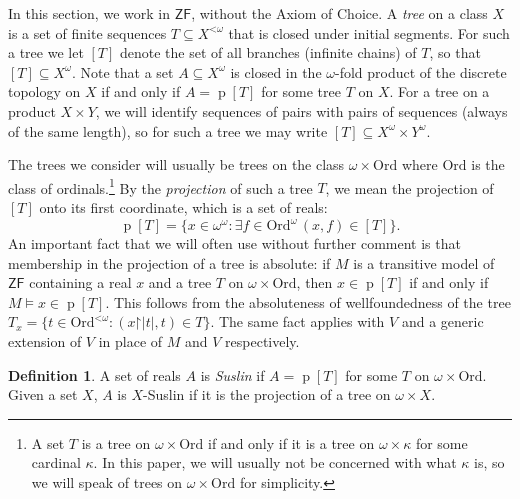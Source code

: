 \documentclass[fleqn, 11pt]{amsart}
\theoremstyle{plain}
\theoremstyle{definition}
\newtheorem{defn}[thm]{Definition} \newtheorem*{defn*}{Definition}
\theoremstyle{remark}
\newcommand{\Ord}{\mathrm{Ord}}
\newcommand{\restrict}{\mathord{\restriction}}
\DeclareMathOperator{\p}{p}
\begin{document}
In this section, we work in $\mathsf{ZF}$, without the Axiom of Choice. 
A \emph{tree} on a class $X$ is a set of finite sequences $T \subseteq X^{\mathord{<}\omega}$
that is closed under initial segments.
For such a tree we let $[T]$ denote the set of all branches (infinite chains) of $T$, so that $[T]\subseteq X^\omega$.
Note that a set $A \subseteq X^\omega$ is closed in the $\omega$-fold product of the discrete topology on $X$ if and only if $A = \p[T]$ for some tree $T$ on $X$.
For a tree on a product $X \times Y$, we will identify sequences of pairs with pairs of sequences (always of the same length),
so for such a tree we may write $[T] \subseteq X^\omega \times Y^\omega$.

The trees we consider will usually be trees on the class $\omega \times \Ord$ where $\Ord$ is the class of ordinals.\footnote{A set $T$ is a tree on $\omega \times \Ord$ if and only if it is a tree on $\omega \times \kappa$ for some cardinal $\kappa$.
In this paper, we will usually not be concerned with what $\kappa$ is, so we will speak of trees on $\omega \times \Ord$ for simplicity.}
By the \emph{projection} of such a tree $T$, we mean the projection of $[T]$ onto its first coordinate, which is a set of reals:
\[ \p[T] = \{x \in \omega^\omega : \exists f \in \Ord^\omega\, (x,f) \in [T]\}.\]
An important fact that we will often use without further comment is that membership in the projection of a tree is absolute: if $M$ is a transitive model of $\mathsf{ZF}$ containing a real $x$ and a tree $T$ on $\omega \times \Ord$, then $x \in \p[T]$ if and only if $M \models x \in \p[T]$.
This follows from the absoluteness of wellfoundedness of the tree $T_{x} = \{t \in \Ord^{\mathord{<}\omega} : (x 
\restrict \left|t\right|, t) \in T\}$.
The same fact applies with $V$ and a generic extension of $V$ in place of $M$ and $V$ respectively.


\begin{defn}\label{Suslindef}
 A set of reals $A$ is \emph{Suslin} if $A = \p[T]$ for some $T$ on $\omega \times \Ord$. Given a set $X$, $A$ is $X$-Suslin if it is the projection of a tree on $\omega \times X$.
\end{defn}


\end{document}
